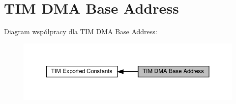 \hypertarget{group___t_i_m___d_m_a___base__address}{}\section{T\+IM D\+MA Base Address}
\label{group___t_i_m___d_m_a___base__address}
Diagram współpracy dla T\+IM D\+MA Base Address\+:\nopagebreak
\begin{figure}[H]
\begin{center}
\leavevmode
\includegraphics[width=350pt]{group___t_i_m___d_m_a___base__address}
\end{center}
\end{figure}
